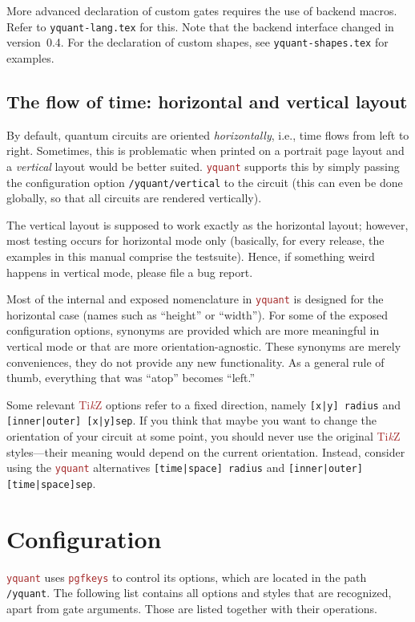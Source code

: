\documentclass{scrartcl}
\makeatletter
\def\TikZ{\textcolor{brown}{Ti\textit kZ}}
\def\pkg#1{\textcolor{brown}{\texttt{#1}}}
\def\ttlink{\link\texttt}
\def\Yquant{\pkg{yquant}}
\newcommand*{\the@orig@section}{}
\let\the@orig@section=\section
\renewcommand*{\section}{%
   \clearpage%
   \the@orig@section%
}
\makeatother
\begin{document}
         More advanced declaration of custom gates requires the use of backend macros.
         Refer to \texttt{yquant-lang.tex} for this.
         Note that the backend interface changed in version~0.4.
         For the declaration of custom shapes, see \texttt{yquant-shapes.tex} for examples.

      \subsection[The flow of time: horizontal and vertical layout]{The flow of time: horizontal and vertical layout}
         By default, quantum circuits are oriented \emph{horizontally}, i.e., time flows from left to right.
         Sometimes, this is problematic when printed on a portrait page layout and a \emph{vertical} layout would be better suited.
         \Yquant{} supports this by simply passing the configuration option \ttlink{/yquant/vertical} to the circuit (this can even be done globally, so that all circuits are rendered vertically).

         The vertical layout is supposed to work exactly as the horizontal layout; however, most testing occurs for horizontal mode only (basically, for every release, the examples in this manual comprise the testsuite).
         Hence, if something weird happens in vertical mode, please file a bug report.

         Most of the internal and exposed nomenclature in \Yquant{} is designed for the horizontal case (names such as ``height'' or ``width'').
         For some of the exposed configuration options, synonyms are provided which are more meaningful in vertical mode or that are more orientation\hyp agnostic.
         These synonyms are merely conveniences, they do not provide any new functionality.
         As a general rule of thumb, everything that was ``atop'' becomes ``left.''

         Some relevant \TikZ{} options refer to a fixed direction, namely \texttt{[x|y] radius} and \texttt{[inner|outer] [x|y]sep}.
         If you think that maybe you want to change the orientation of your circuit at some point, you should never use the original \TikZ{} styles---their meaning would depend on the current orientation.
         Instead, consider using the \Yquant{} alternatives \texttt{[time|space] radius} and \texttt{[inner|outer] [time|space]sep}.

   \section{Configuration}\label{sec:config}
      \Yquant{} uses \pkg{pgfkeys} to control its options, which are located in the path \texttt{/yquant}.
      The following list contains all options and styles that are recognized, apart from gate arguments.
      Those are listed together with their operations.
\end{document}
